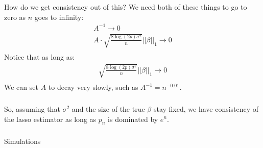 \begin{frame}[fragile] \frametitle{}

How do we get consistency out of this? We need both of these things to
go to zero as $n$ goes to infinity:
\begin{align*}
A^{-1} \rightarrow 0 \\
A \cdot \sqrt{\frac{8 \log(2p) \sigma^2}{n}} || \beta ||_1 \rightarrow 0 \\
\end{align*}
\pause Notice that as long as:
\begin{align*}
\sqrt{\frac{8 \log(2p) \sigma^2}{n}} || \beta ||_1 \rightarrow 0 \\
\end{align*}
We can set $A$ to decay very slowly, such as $A^{-1} = n^{-0.01}$.

\end{frame}

\begin{frame}[fragile] \frametitle{}

So, assuming that $\sigma^2$ and the size of the true $\beta$ stay fixed,
we have consistency of the lasso estimator as long as $p_n$ is dominated
by $e^n$.

\end{frame}


\begin{frame}[fragile] \frametitle{}

\begin{flushright}
{\color{yaleblue}\sc\fontsize{1cm}{0cm}\selectfont Simulations}
\end{flushright}

\end{frame}















